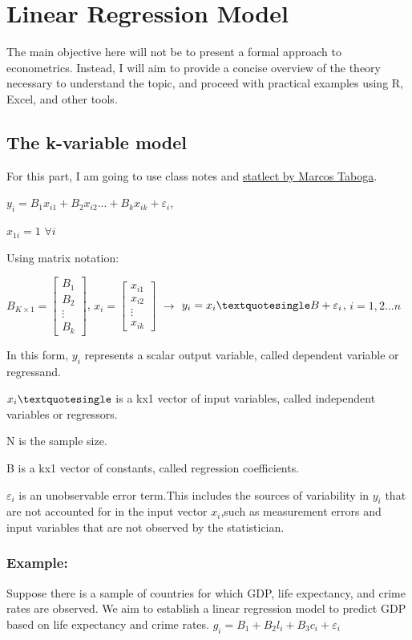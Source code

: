 \documentclass{article} %
\begin{document}
\section{Linear Regression Model}
The main objective here will not be to present a formal approach to econometrics. Instead, I will aim to provide a concise overview of the theory necessary to understand the topic, and proceed with practical examples using R, Excel, and other tools.

\subsection{The k-variable model}
For this part, I am going to use class notes and \href{https://www.statlect.com/fundamentals-of-statistics/linear-regression}{statlect by Marcos Taboga}. 

\(y_i = B_1x_{i1}+B_2x_{i2}...+B_kx_{ik}+\varepsilon_i\), 

\(  x_{1i}=1\) \(\forall{i}\)\

Using matrix notation:


\(B_{K \times 1} = \begin{bmatrix} B_1 \\ B_2 \\ \vdots \\ B_k \end{bmatrix}\),  \(x_{i}=\begin{bmatrix} x_{i1}\\x_{i2}\\ \vdots \\ x_{ik} \end{bmatrix}\) \(\rightarrow\) \(y_i=x_i\textquotesingle B+ \varepsilon_i\), \(i=1,2...n\)


In this form, \(y_i\) represents a scalar output variable, called dependent variable or regressand.


\(x_i\textquotesingle\) is a kx1 vector of input variables, called independent variables or regressors.

N is the sample size.

B is a kx1 vector of constants, called regression coefficients.

\(\varepsilon_i\) is an unobservable error term.This includes the sources of variability in \(y_i\) that are not accounted for in the input vector \(x_i\),such as measurement errors and input variables that are not observed by the statistician.

\subsubsection{Example:}
Suppose there is a sample of countries for which GDP, life expectancy, and crime rates are observed. We aim to establish a linear regression model to predict GDP based on life expectancy and crime rates.
\(g_i = B_1 + B_2l_i + B_3c_i + \varepsilon_i \)
\end{document}
